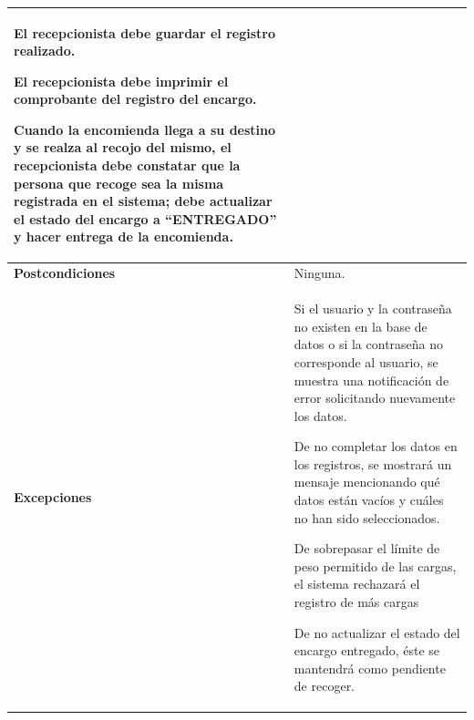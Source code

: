 \begin{longtable}{m{4cm} m{10.5cm}}
		El recepcionista debe guardar el registro realizado.
		
		El recepcionista debe imprimir el comprobante del registro del encargo.
		
		Cuando la encomienda llega a su destino y se realza al recojo del mismo, el recepcionista debe constatar que la persona que recoge sea la misma registrada en el sistema; debe actualizar el estado del encargo a “ENTREGADO” y hacer entrega de la encomienda. \\ \hline
		\textbf{Postcondiciones} & Ninguna.\\ \hline
		\textbf{Excepciones} & Si el usuario y la contraseña no existen en la base de datos o si la contraseña no corresponde al usuario, se muestra una notificación de error solicitando nuevamente los datos.
		
		De no completar los datos en los registros, se mostrará un mensaje mencionando qué datos están vacíos y cuáles no han sido seleccionados.
		
		De sobrepasar el límite de peso permitido de las cargas, el sistema rechazará el registro de más cargas
		
		De no actualizar el estado del encargo entregado, éste se mantendrá como pendiente de recoger. \\		
	\end{longtable}
	
	\endgroup 
	\vspace{-6pt}  %
	
	\begingroup
	\onehalfspacing
	
